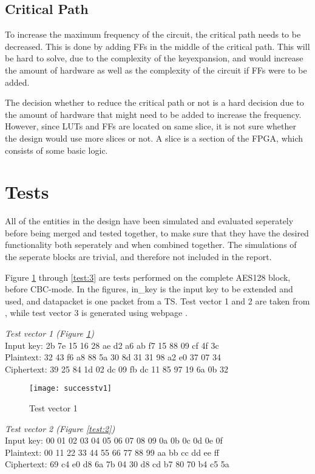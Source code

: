 \subsection{Critical Path}\label{sec:c_path}
To increase the maximum frequency of the circuit, the critical path 
needs to be decreased. This is done by adding FFs in the middle of the 
critical path. This will be hard to solve, due to the complexity of 
the keyexpansion, and would increase the amount of hardware as well as 
the complexity of the circuit if FFs were to be added.

The decision whether to reduce the critical path or not is a hard 
decision due to the amount of hardware that might need to be added to
increase the frequency. However, since LUTs and FFs are located on 
same slice, it is not sure whether the design would use more slices or 
not. A slice is a section of the FPGA, which consists of some basic 
logic.

\section{Tests}
All of the entities in the design have been simulated and evaluated 
seperately before being merged and tested together, to make sure that 
they have the desired functionality both seperately and when combined 
together. The simulations of the seperate blocks are trivial, and 
therefore not included in the report. 

Figure \ref{test:1} through \ref{test:3} are tests performed on the 
complete AES128 block, before CBC-mode. In the figures, in\_key is 
the input key to be extended and used, and datapacket is one packet 
from a TS. Test vector 1 and 2 are taken from \citet{AES:2001}, while 
test vector 3 is generated using webpage \citep{Generator}.

\emph{Test vector 1 (Figure \ref{test:1})}\\
Input key: 2b 7e 15 16 28 ae d2 a6 ab f7 15 88 09 cf 4f 3c\\
Plaintext: 32 43 f6 a8 88 5a 30 8d 31 31 98 a2 e0 37 07 34\\
Ciphertext: 39 25 84 1d 02 dc 09 fb dc 11 85 97 19 6a 0b 32

\begin{figure}
  \texttt{[image: successtv1]}
  \caption{Test vector 1}
  \label{test:1}
\end{figure}

\emph{Test vector 2 (Figure \ref{test:2})}\\
Input key: 00 01 02 03 04 05 06 07 08 09 0a 0b 0c 0d 0e 0f\\
Plaintext: 00 11 22 33 44 55 66 77 88 99 aa bb cc dd ee ff\\
Ciphertext: 69 c4 e0 d8 6a 7b 04 30 d8 cd b7 80 70 b4 c5 5a

